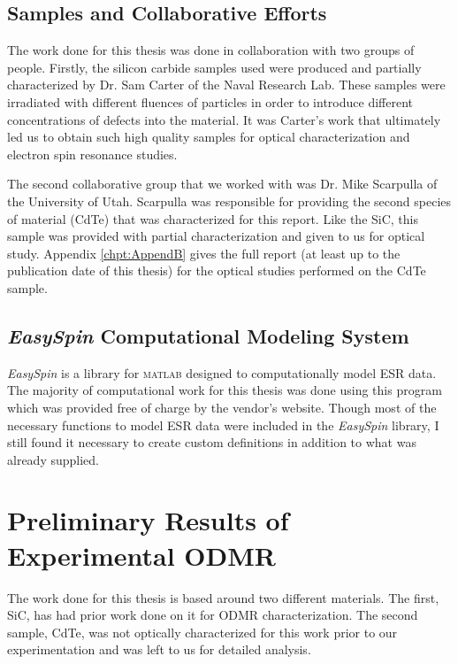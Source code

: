 \documentclass[oneside, astronomy, noacknowlegments]{BYUPhys}
\begin{document}
\subsection{Samples and Collaborative Efforts}

The work done for this thesis was done in collaboration with two groups of people. Firstly, the silicon carbide samples used were produced and partially characterized by Dr. Sam Carter of the Naval Research Lab. These samples were irradiated with different fluences of particles in order to introduce different concentrations of defects into the material. It was Carter's work that ultimately led us to obtain such high quality samples for optical characterization and electron spin resonance studies.

The second collaborative group that we worked with was Dr. Mike Scarpulla of the University of Utah. Scarpulla was responsible for providing the second species of material (CdTe) that was characterized for this report. Like the SiC, this sample was provided with partial characterization and given to us for optical study. Appendix \ref{chpt:AppendB} gives the full report (at least up to the publication date of this thesis) for the optical studies performed on the CdTe sample.

\subsection{\textit{EasySpin} Computational Modeling System}

\textit{EasySpin} is a library for \textsc{matlab} designed to computationally model ESR data. The majority of computational work for this thesis was done using this program which was provided free of charge by the vendor's website. Though most of the necessary functions to model ESR data were included in the \textit{EasySpin} library, I still found it necessary to create custom definitions in addition to what was already supplied.

\section{Preliminary Results of Experimental ODMR}

The work done for this thesis is based around two different materials. The first, SiC, has had prior work done on it for ODMR characterization. The second sample, CdTe, was not optically characterized for this work prior to our experimentation and was left to us for detailed analysis.
\end{document}
